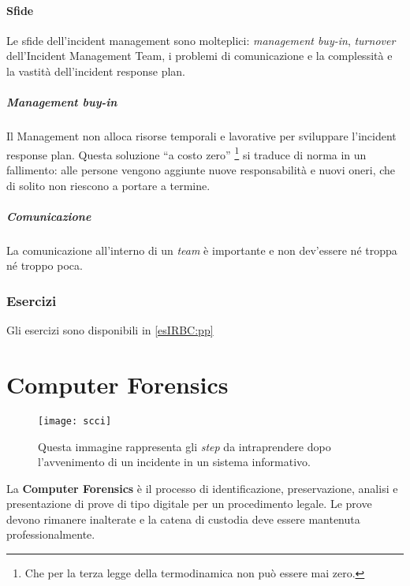 \subsubsection{Sfide}

Le sfide dell'incident management sono molteplici:
\textit{management buy-in}, \textit{turnover} dell'Incident Management
Team, i problemi di comunicazione e la complessità e la vastità dell'incident response plan.

\paragraph*{Management buy-in}
Il Management non alloca risorse temporali e lavorative per sviluppare
l'incident response plan. Questa soluzione ``a costo zero''
\footnote{Che per la terza legge della termodinamica non può essere mai
zero.} si traduce di norma in un fallimento: alle persone vengono aggiunte
nuove responsabilità e nuovi oneri, che di solito non riescono a portare
a termine.

\paragraph*{Comunicazione} La comunicazione all'interno di un \textit{team} è
importante e non dev'essere né troppa né troppo poca.


\subsection{Esercizi}

Gli esercizi sono disponibili in \ref{esIRBC:pp}

\chapter{Computer Forensics}
\label{IRBC:cf}

\begin{wrapfigure}{r}{0.5\textwidth}
  \begin{center}
    \texttt{[image: scci]}
  \end{center}
  \caption[Passi di una \textit{computer crime investigation}]{
  Questa immagine rappresenta gli \textit{step} da intraprendere dopo
  l'avvenimento di un incidente in un sistema informativo.
  }
\end{wrapfigure}


La \textbf{Computer Forensics} è il processo di identificazione, preservazione,
analisi e presentazione di prove di tipo digitale per un procedimento legale.
Le prove devono rimanere inalterate e la catena di custodia deve essere
mantenuta professionalmente.

